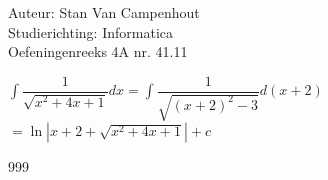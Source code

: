 \documentclass[a4paper]{article}
\begin{document}
  
\noindent \large Auteur: Stan Van Campenhout \\
\noindent \large Studierichting:  Informatica\\
\noindent \large Oefeningenreeks 4A nr. 41.11\\

\medskip

\normalsize

$ \displaystyle\int\dfrac{1}{\sqrt{x^2 +4x + 1}}dx = \displaystyle\int\dfrac{1}{\sqrt{\left(x+2\right)^2 - 3}}d\left(x+2\right) $\\

$ = \ln\left|x+2 + \sqrt{x^2 +4x + 1}\right| + c $\\

\begin{thebibliography}{999}
\end{thebibliography}
\end{document}
